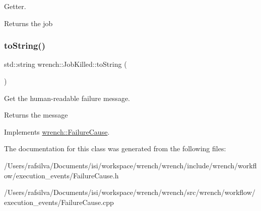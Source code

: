 Getter. 

\begin{DoxyReturn}{Returns}
the job 
\end{DoxyReturn}
\mbox{\label{classwrench_1_1_job_killed_aa9c6b749d16db4a313ffdd83629f1c76}} 
\subsubsection{\texorpdfstring{to\+String()}{toString()}}
{\footnotesize\ttfamily std\+::string wrench\+::\+Job\+Killed\+::to\+String (\begin{DoxyParamCaption}{ }\end{DoxyParamCaption})\hspace{0.3cm}{\ttfamily [virtual]}}



Get the human-\/readable failure message. 

\begin{DoxyReturn}{Returns}
the message 
\end{DoxyReturn}


Implements \hyperlink{classwrench_1_1_failure_cause_afbad248ebe902409f2cd4f1d6f2b867d}{wrench\+::\+Failure\+Cause}.



The documentation for this class was generated from the following files\+:\begin{DoxyCompactItemize}
\item 
/\+Users/rafsilva/\+Documents/isi/workspace/wrench/wrench/include/wrench/workflow/execution\+\_\+events/Failure\+Cause.\+h\item 
/\+Users/rafsilva/\+Documents/isi/workspace/wrench/wrench/src/wrench/workflow/execution\+\_\+events/Failure\+Cause.\+cpp\end{DoxyCompactItemize}

